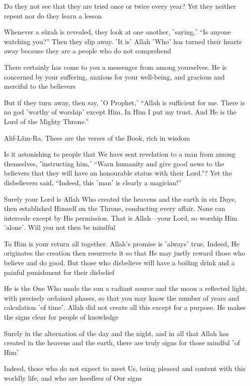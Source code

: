Do they not see that they are tried once or twice every year? Yet they neither repent nor do they learn a lesson

Whenever a sûrah is revealed, they look at one another, ˹saying,˺ “Is anyone watching you?” Then they slip away. ˹It is˺ Allah ˹Who˺ has turned their hearts away because they are a people who do not comprehend

There certainly has come to you a messenger from among yourselves. He is concerned by your suffering, anxious for your well-being, and gracious and merciful to the believers

But if they turn away, then say, ˹O Prophet,˺ “Allah is sufficient for me. There is no god ˹worthy of worship˺ except Him. In Him I put my trust. And He is the Lord of the Mighty Throne.”

Alif-Lãm-Ra. These are the verses of the Book, rich in wisdom

Is it astonishing to people that We have sent revelation to a man from among themselves, ˹instructing him,˺ “Warn humanity and give good news to the believers that they will have an honourable status with their Lord.”? Yet the disbelievers said, “Indeed, this ˹man˺ is clearly a magician!”

Surely your Lord is Allah Who created the heavens and the earth in six Days, then established Himself on the Throne, conducting every affair. None can intercede except by His permission. That is Allah—your Lord, so worship Him ˹alone˺. Will you not then be mindful

To Him is your return all together. Allah’s promise is ˹always˺ true. Indeed, He originates the creation then resurrects it so that He may justly reward those who believe and do good. But those who disbelieve will have a boiling drink and a painful punishment for their disbelief

He is the One Who made the sun a radiant source and the moon a reflected light, with precisely ordained phases, so that you may know the number of years and calculation ˹of time˺. Allah did not create all this except for a purpose. He makes the signs clear for people of knowledge

Surely in the alternation of the day and the night, and in all that Allah has created in the heavens and the earth, there are truly signs for those mindful ˹of Him˺

Indeed, those who do not expect to meet Us, being pleased and content with this worldly life, and who are heedless of Our signs

